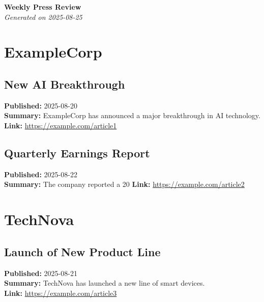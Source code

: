 \documentclass[11pt]{article}
\begin{document}
\begin{center}
    {\LARGE \textbf{Weekly Press Review}}\\
    \vspace{0.5em}
    \textit{Generated on 2025-08-25}
\end{center}

\vspace{1em}
\tableofcontents
\newpage

\section{ExampleCorp}
\subsection{New AI Breakthrough}
\textbf{Published:} 2025-08-20 \\
\textbf{Summary:} ExampleCorp has announced a major breakthrough in AI technology.\\
\textbf{Link:} \url{https://example.com/article1}

\vspace{1em}

\subsection{Quarterly Earnings Report}
\textbf{Published:} 2025-08-22 \\
\textbf{Summary:} The company reported a 20%
\textbf{Link:} \url{https://example.com/article2}

\section{TechNova}
\subsection{Launch of New Product Line}
\textbf{Published:} 2025-08-21 \\
\textbf{Summary:} TechNova has launched a new line of smart devices.\\
\textbf{Link:} \url{https://example.com/article3}
\end{document}
